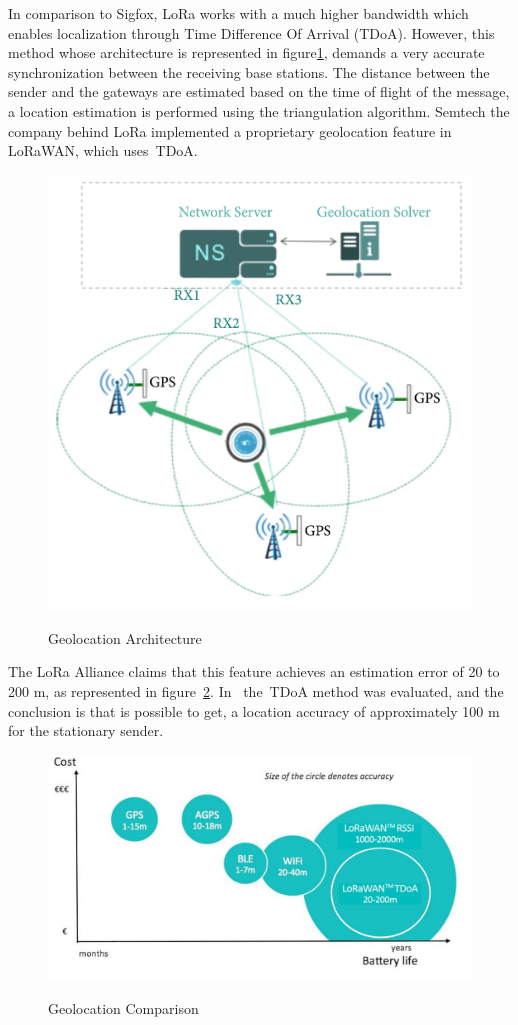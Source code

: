 In comparison to Sigfox, LoRa works with a much higher bandwidth which enables localization through Time Difference Of Arrival (TDoA). However, this method whose architecture is represented in figure\ref{fig:lora_Geo_Arch}, demands a  very accurate synchronization between the receiving base stations. The distance between the sender and the gateways are estimated based on the time of flight of the message, a location estimation is performed using the triangulation algorithm. Semtech the company behind LoRa implemented a proprietary geolocation feature in LoRaWAN, which uses~\gls{TDoA}. \newline\newline\newline
\begin{figure}[htbp]
  \centering
    {\includegraphics[width=0.5\linewidth]{Chapters/Figures/lorageo.JPG}}%
  \caption{Geolocation Architecture~\cite{Podevijn2018}}
  \label{fig:lora_Geo_Arch}
\end{figure}
\newpage
The LoRa Alliance claims that this feature achieves an estimation error of 20 to 200 m, as represented in figure~\ref{fig:lora_Geo_compare}. In~\cite{Fargas2017RL1} the~\gls{TDoA} method was evaluated, and the conclusion is  that is possible to get, a location accuracy of approximately 100 m for the stationary sender.\newline
\begin{figure}[htbp]
  \centering
    {\includegraphics[width=0.65\linewidth]{Chapters/Figures/lorageocopare.JPG}}%
  \caption{Geolocation Comparison~\cite{LoRa-Geo-White}}
  \label{fig:lora_Geo_compare}
\end{figure}
